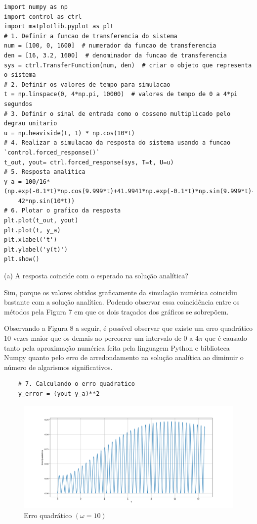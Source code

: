 \documentclass[10pt]{article}
\begin{document}
\begin{lstlisting}
import numpy as np
import control as ctrl
import matplotlib.pyplot as plt
# 1. Definir a funcao de transferencia do sistema
num = [100, 0, 1600]  # numerador da funcao de transferencia
den = [16, 3.2, 1600]  # denominador da funcao de transferencia
sys = ctrl.TransferFunction(num, den)  # criar o objeto que representa o sistema
# 2. Definir os valores de tempo para simulacao
t = np.linspace(0, 4*np.pi, 10000)  # valores de tempo de 0 a 4*pi segundos
# 3. Definir o sinal de entrada como o cosseno multiplicado pelo degrau unitario
u = np.heaviside(t, 1) * np.cos(10*t)
# 4. Realizar a simulacao da resposta do sistema usando a funcao `control.forced_response()`
t_out, yout= ctrl.forced_response(sys, T=t, U=u)
# 5. Resposta analitica
y_a = 100/16*(np.exp(-0.1*t)*np.cos(9.999*t)+41.9941*np.exp(-0.1*t)*np.sin(9.999*t)-
    42*np.sin(10*t))
# 6. Plotar o grafico da resposta
plt.plot(t_out, yout)
plt.plot(t, y_a)
plt.xlabel('t')
plt.ylabel('y(t)')
plt.show()
\end{lstlisting}

(a) A resposta coincide com o esperado na solução analítica?

\quad Sim, porque os valores obtidos graficamente da simulação numérica coincidiu bastante com a solução analítica.
Podendo observar essa coincidência entre os métodos pela Figura 7 em que os dois traçados dos gráficos se sobrepõem.

\quad Observando a Figura 8 a seguir, é possível observar que existe um erro quadrático 10 vezes maior que os demais
ao percorrer um intervalo de 0 a 4$\pi$ que é causado tanto pela aproximação numérica feita pela linguagem Python e biblioteca Numpy
quanto pelo erro de arredondamento na solução analítica ao diminuir o número de algarismos significativos.

\begin{lstlisting}
    # 7. Calculando o erro quadratico
    y_error = (yout-y_a)**2
\end{lstlisting}

\newpage

\begin{figure}[h]
    \centering
    \includegraphics[scale=0.4]{erro3.png}
    \caption{Erro quadrático $(\omega = 10)$}
\end{figure}
\end{document}
